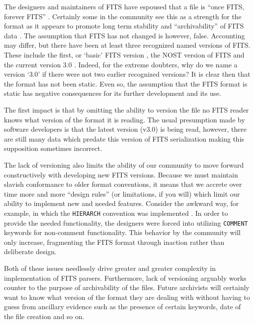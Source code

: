 \documentclass[final,authoryear,5p,times,twocolumn]{elsarticle}
\begin{document}
{{The designers and maintainers of FITS have espoused that a file is
``once FITS, forever FITS'' \citep[see e.g.,][]{1988A&AS...73..359G,1993FITS1}.
Certainly some in the community see this as a strength for the format
as it appears to promote long term stability and ``archivability'' of FITS
data \citep{2012EWASSAlle,2012LOC}. The assumption that FITS has not changed
is however, false. Accounting may differ, but there have been at least three
recognized named versions of FITS. These include the first, or `basic' FITS
version \citep{1979ipia.coll..445W}, the NOST version of FITS
\citep{2001A&A...376..359H} and the current version 3.0 \citep{2010A&A...524A..42P}.
Indeed, for the extreme doubters, why do we name a version `3.0' if there
were not two earlier recognized versions? It is clear then that the format
has not been static.  Even so, the assumption that the FITS format is static
has negative consequences for its further development and its use.


The first impact is that by omitting the ability to version the file no
FITS reader knows what version of the format it is reading. The usual
presumption made by software developers is that the latest version (v3.0)
is being read, however, there are still many data which predate
this version of FITS serialization making this supposition sometimes
incorrect.


The lack of versioning also limits the ability of our community to
move forward constructively with developing new FITS versions. Because
we must maintain slavish conformance to older format conventions, it
means that we accrete over time more and more ``design rules'' (or
limitations, if you will) which limit our ability to implement new and
needed features. Consider the awkward way, for example, in which the
\texttt{HIERARCH} convention was implemented \citep{2009Wic}.
In order to provide the needed functionality, the designers
were forced into utilizing \texttt{COMMENT} keywords for non-comment
functionality. This behavior by the community will only increase,
fragmenting the FITS format through inaction rather than deliberate
design.


Both of these issues needlessly drive greater and greater complexity
in implementation of FITS parsers. Furthermore, lack of versioning
arguably works counter to the purpose of archivability of the files. 
Future archivists will certainly want to know what version of the
format they are dealing with without having to guess from ancillary
evidence such as the presence of certain keywords, date of the file
creation and so on.


}}
\end{document}

